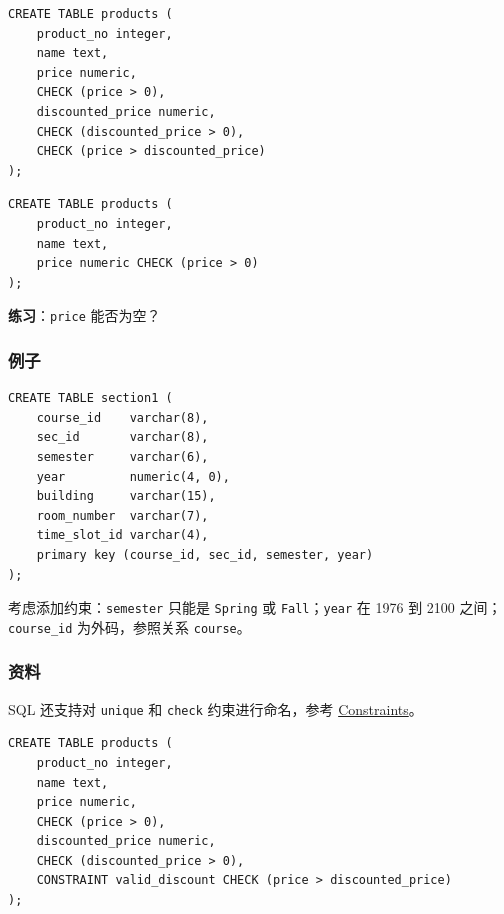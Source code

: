 \documentclass[aspectratio=169, 14pt]{beamer}
\begin{document}
\begin{frame}[fragile]

	\begin{verbatim}
CREATE TABLE products (
    product_no integer,
    name text,
    price numeric,
    CHECK (price > 0),
    discounted_price numeric,
    CHECK (discounted_price > 0),
    CHECK (price > discounted_price)
);
    \end{verbatim}
\end{frame}

\begin{frame}[fragile]
	\begin{verbatim}
CREATE TABLE products (
    product_no integer,
    name text,
    price numeric CHECK (price > 0)
);
    \end{verbatim}
	{\large {}}  \textbf{练习}：\texttt{price} 能否为空？

	\pause


\end{frame}

\begin{frame}[fragile]
	\frametitle{例子}

	\begin{verbatim}
CREATE TABLE section1 (
    course_id    varchar(8),
    sec_id       varchar(8),
    semester     varchar(6),
    year         numeric(4, 0),
    building     varchar(15),
    room_number  varchar(7),
    time_slot_id varchar(4),
    primary key (course_id, sec_id, semester, year)
);
\end{verbatim}

	考虑添加约束：\texttt{semester} 只能是 \texttt{Spring} 或 \texttt{Fall}；\texttt{year} 在 1976 到 2100 之间；\texttt{course\_id} 为外码，参照关系 \texttt{course}。
\end{frame}

\begin{frame}[fragile]
	\frametitle{资料}
	SQL 还支持对 \texttt{unique} 和 \texttt{check} 约束进行命名，参考 \href{https://www.postgresql.org/docs/14/ddl-constraints.html}{Constraints}。

	\begin{verbatim}
CREATE TABLE products (
    product_no integer,
    name text,
    price numeric,
    CHECK (price > 0),
    discounted_price numeric,
    CHECK (discounted_price > 0),
    CONSTRAINT valid_discount CHECK (price > discounted_price)
);
\end{verbatim}

\end{frame}
\end{document}
